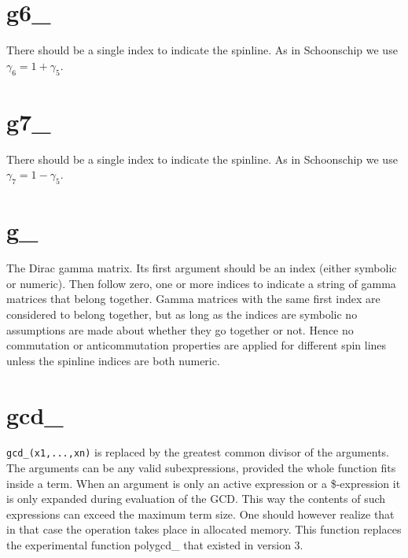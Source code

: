 \section{g6\_}
\label{fungsix}
\noindent There should be a single index to indicate the spinline. 
As in Schoonschip we use $\gamma_6 = 1+\gamma_5$.


\section{g7\_}
\label{fungseven}
\noindent There should be a single index to indicate the spinline. 
As in Schoonschip we use $\gamma_7 = 1-\gamma_5$.


\section{g\_}
\label{fung}
\noindent The Dirac gamma matrix. Its 
first argument should be an index (either symbolic or numeric). Then follow 
zero, one or more indices to indicate a string of gamma matrices that 
belong together. Gamma matrices with the same first index are considered to 
belong together, but as long as the indices are symbolic no assumptions are 
made about whether they go together or not. Hence no commutation or 
anticommutation properties are applied for different spin lines unless the 
spinline indices are both numeric.


\section{gcd\_}
\label{fungcd}
\noindent \verb:gcd_(x1,...,xn): is replaced by the greatest common divisor 
of the arguments. The arguments can be any valid subexpressions, provided 
the whole function fits inside a term. When an argument is only an active 
expression or a \$-expression it is only expanded during evaluation of the 
GCD. This way the contents of such expressions can exceed the maximum term 
size. One should however realize that in that case the operation takes 
place in allocated memory.
This function replaces the experimental function 
polygcd\_ that existed in 
version 3.

